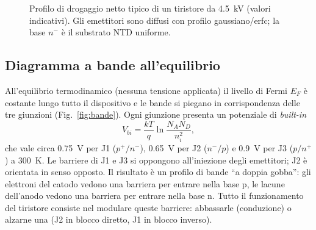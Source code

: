 \documentclass[11pt,a4paper]{article}
\newcommand{\en}[1]{\emph{#1}}   %
\begin{document}
\begin{figure}[htbp]
\centering
{}
\caption{Profilo di drogaggio netto tipico di un tiristore da \qty{4.5}{\kV} (valori indicativi). Gli emettitori sono diffusi con profilo gaussiano/erfc; la base $n^-$ è il substrato NTD uniforme.}
\label{fig:doping}
\end{figure}

\subsection{Diagramma a bande all'equilibrio}
All'equilibrio termodinamico (nessuna tensione applicata) il livello di Fermi $E_F$ è costante lungo tutto il dispositivo e le bande si piegano in corrispondenza delle tre giunzioni (Fig.~\ref{fig:bande}). Ogni giunzione presenta un potenziale di \en{built-in}
\begin{equation}
  V_{bi} = \frac{kT}{q}\ln\frac{N_A N_D}{n_i^2},
  \label{eq:vbi}
\end{equation}
che vale circa \qty{0.75}{\V} per J1 ($p^+/n^-$), \qty{0.65}{\V} per J2 ($n^-/p$) e \qty{0.9}{\V} per J3 ($p/n^+$) a \qty{300}{\K}. Le barriere di J1 e J3 si oppongono all'iniezione degli emettitori; J2 è orientata in senso opposto. Il risultato è un profilo di bande ``a doppia gobba'': gli elettroni del catodo vedono una barriera per entrare nella base p, le lacune dell'anodo vedono una barriera per entrare nella base n. Tutto il funzionamento del tiristore consiste nel modulare queste barriere: abbassarle (conduzione) o alzarne una (J2 in blocco diretto, J1 in blocco inverso).
\end{document}

